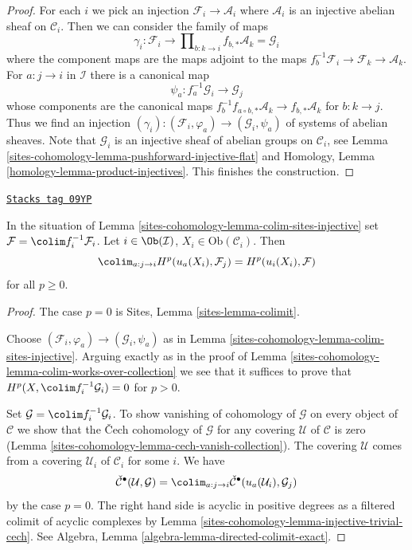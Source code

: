 \begin{proof}
For each $i$ we pick an injection $\mathcal{F}_i \to \mathcal{A}_i$
where $\mathcal{A}_i$ is an injective abelian sheaf on $\mathcal{C}_i$.
Then we can consider the family of maps
$$
\gamma_i :
\mathcal{F}_i
\longrightarrow
\prod\nolimits_{b : k \to i} f_{b, *}\mathcal{A}_k = \mathcal{G}_i
$$
where the component maps are the maps adjoint to the maps
$f_b^{-1}\mathcal{F}_i \to \mathcal{F}_k \to \mathcal{A}_k$.
For $a : j \to i$ in $\mathcal{I}$ there is a canonical map
$$
\psi_a : f_a^{-1}\mathcal{G}_i \to \mathcal{G}_j
$$
whose components are the canonical maps
$f_b^{-1}f_{a \circ b, *}\mathcal{A}_k \to f_{b, *}\mathcal{A}_k$
for $b : k \to j$. Thus we find an injection
$(\gamma_i) : (\mathcal{F}_i, \varphi_a) \to (\mathcal{G}_i, \psi_a)$
of systems of abelian sheaves. Note that $\mathcal{G}_i$ is an injective
sheaf of abelian groups on $\mathcal{C}_i$, see
Lemma \ref{sites-cohomology-lemma-pushforward-injective-flat} and
Homology, Lemma \ref{homology-lemma-product-injectives}.
This finishes the construction.
\end{proof}

\begin{lemma}[Colimit]
\label{sites-cohomology-lemma-colimit}
\href{https://stacks.math.columbia.edu/tag/09YP}{\texttt{Stacks tag 09YP}}

In the situation of Lemma \ref{sites-cohomology-lemma-colim-sites-injective} set
$\mathcal{F} = \colim f_i^{-1}\mathcal{F}_i$.
Let $i \in \Ob(\mathcal{I})$, $X_i \in \text{Ob}(\mathcal{C}_i)$. Then
$$
\colim_{a : j \to i} H^p(u_a(X_i), \mathcal{F}_j) =
H^p(u_i(X_i), \mathcal{F})
$$
for all $p \geq 0$.
\end{lemma}

\begin{proof}
The case $p = 0$ is Sites, Lemma \ref{sites-lemma-colimit}.

\medskip\noindent
Choose $(\mathcal{F}_i, \varphi_a) \to (\mathcal{G}_i, \psi_a)$
as in Lemma \ref{sites-cohomology-lemma-colim-sites-injective}.
Arguing exactly as in the proof of
Lemma \ref{sites-cohomology-lemma-colim-works-over-collection}
we see that it suffices to prove that
$H^p(X, \colim f_i^{-1}\mathcal{G}_i) = 0$ for $p > 0$.

\medskip\noindent
Set $\mathcal{G} = \colim f_i^{-1}\mathcal{G}_i$.
To show vanishing of cohomology of $\mathcal{G}$ on every object
of $\mathcal{C}$ we show that the {\v C}ech cohomology of $\mathcal{G}$
for any covering $\mathcal{U}$ of $\mathcal{C}$ is zero
(Lemma \ref{sites-cohomology-lemma-cech-vanish-collection}).
The covering $\mathcal{U}$ comes from a covering
$\mathcal{U}_i$ of $\mathcal{C}_i$ for some $i$. We have
$$
\check{\mathcal{C}}^\bullet(\mathcal{U}, \mathcal{G}) =
\colim_{a : j \to i}
\check{\mathcal{C}}^\bullet(u_a(\mathcal{U}_i), \mathcal{G}_j)
$$
by the case $p = 0$. The right hand side is acyclic in positive degrees
as a filtered colimit of acyclic complexes by
Lemma \ref{sites-cohomology-lemma-injective-trivial-cech}. See
Algebra, Lemma \ref{algebra-lemma-directed-colimit-exact}.
\end{proof}

